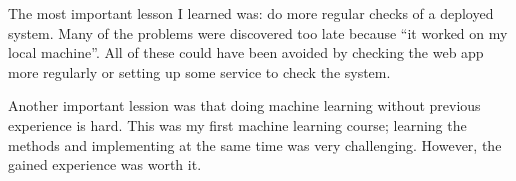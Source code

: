 The most important lesson I learned was: do more regular checks of a deployed system. Many of the problems were discovered too late because ``it worked on my local machine''. All of these could have been avoided by checking the web app more regularly or setting up some service to check the system.

Another important lession was that doing machine learning without previous experience is hard. This was my first machine learning course; learning the methods and implementing at the same time was very challenging. However, the gained experience was worth it.
